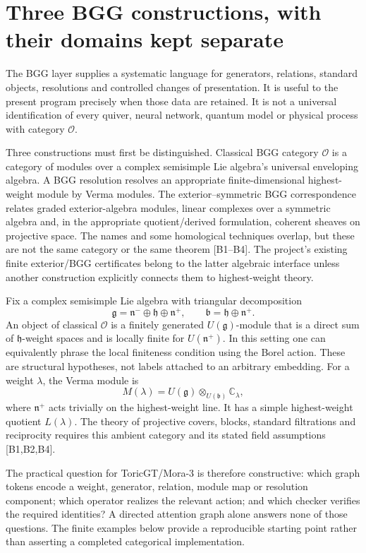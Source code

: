 \section{Three BGG constructions, with their domains kept separate}
\label{sec:wb-bgg-domains}

The BGG layer supplies a systematic language for generators, relations, standard objects, resolutions and controlled changes of presentation. It is useful to the present program precisely when those data are retained. It is not a universal identification of every quiver, neural network, quantum model or physical process with category $\mathcal O$.

Three constructions must first be distinguished. Classical BGG category $\mathcal O$ is a category of modules over a complex semisimple Lie algebra's universal enveloping algebra. A BGG resolution resolves an appropriate finite-dimensional highest-weight module by Verma modules. The exterior--symmetric BGG correspondence relates graded exterior-algebra modules, linear complexes over a symmetric algebra and, in the appropriate quotient/derived formulation, coherent sheaves on projective space. The names and some homological techniques overlap, but these are not the same category or the same theorem [B1--B4]. The project's existing finite exterior/BGG certificates belong to the latter algebraic interface unless another construction explicitly connects them to highest-weight theory.

Fix a complex semisimple Lie algebra with triangular decomposition
\[
 \mathfrak g=\mathfrak n^-\oplus\mathfrak h\oplus\mathfrak n^+,
 \qquad \mathfrak b=\mathfrak h\oplus\mathfrak n^+.
\]
An object of classical $\mathcal O$ is a finitely generated $U(\mathfrak g)$-module that is a direct sum of $\mathfrak h$-weight spaces and is locally finite for $U(\mathfrak n^+)$. In this setting one can equivalently phrase the local finiteness condition using the Borel action. These are structural hypotheses, not labels attached to an arbitrary embedding. For a weight $\lambda$, the Verma module is
\[
 M(\lambda)=U(\mathfrak g)\otimes_{U(\mathfrak b)}\mathbb C_\lambda,
\]
where $\mathfrak n^+$ acts trivially on the highest-weight line. It has a simple highest-weight quotient $L(\lambda)$. The theory of projective covers, blocks, standard filtrations and reciprocity requires this ambient category and its stated field assumptions [B1,B2,B4].

The practical question for ToricGT/Mora-3 is therefore constructive: which graph tokens encode a weight, generator, relation, module map or resolution component; which operator realizes the relevant action; and which checker verifies the required identities? A directed attention graph alone answers none of those questions. The finite examples below provide a reproducible starting point rather than asserting a completed categorical implementation.

